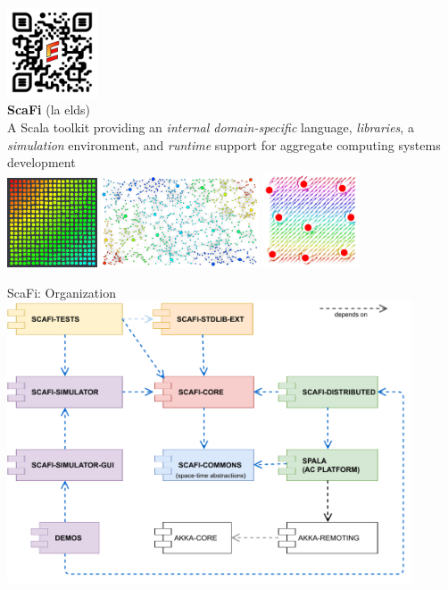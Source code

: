 \documentclass[presentation, 8pt]{beamer}\mode<presentation>{\usetheme{AMSBolognaFC}}
\begin{document}
\begin{frame}[c, plain]
\begin{center}
	\includegraphics[width=0.2\textwidth]{img/qr-code-scafi.png}\\
	{\Huge \textbf{ScaFi} (la elds)}\\
	{\large A Scala toolkit providing an \emph{internal domain-specific} language, \emph{libraries}, a \emph{simulation} environment, and \emph{runtime} support for  aggregate computing systems development} \\[0.3cm]
	\includegraphics[width=0.2\textwidth]{img/gradient-scafi.png}
	\includegraphics[width=0.35\textwidth]{img/scr-result.png}
	\includegraphics[width=0.215\textwidth]{img/obstacle-avoidance.png}
\end{center}
\end{frame}
\begin{frame}{ScaFi: Organization}
\centering
\includegraphics[width=0.9\textwidth]{img/scafi-project-org.pdf}
\end{frame}
\end{document}
